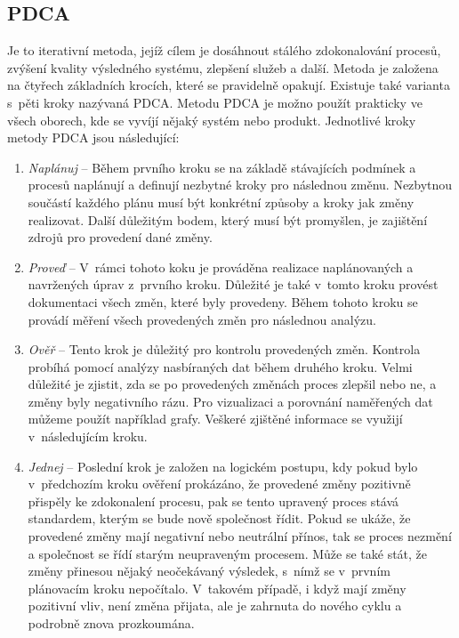 \documentclass[czech,master]{diploma}
\begin{document}
\subsection{PDCA}
Je to iterativní metoda, jejíž cílem je dosáhnout stálého zdokonalování procesů, zvýšení kvality výsledného systému, zlepšení služeb a další. Metoda je založena na čtyřech základních krocích, které se pravidelně opakují. Existuje také varianta s~pěti kroky nazývaná PDCA. Metodu PDCA je možno použít prakticky ve všech oborech, kde se vyvíjí nějaký systém nebo produkt.  Jednotlivé kroky metody PDCA jsou následující:

\begin{enumerate}
\item \textit{Naplánuj} -- Během prvního kroku se na základě stávajících podmínek a procesů naplánují a definují nezbytné kroky pro následnou změnu. Nezbytnou součástí každého plánu musí být konkrétní způsoby a kroky jak změny realizovat. Další důležitým bodem, který musí být promyšlen, je zajištění zdrojů pro provedení dané změny.
\item \textit{Proveď} -- V~rámci tohoto koku je prováděna realizace naplánovaných a navržených úprav z~prvního kroku. Důležité je také v~tomto kroku provést dokumentaci všech změn, které byly provedeny. Během tohoto kroku se provádí měření všech provedených změn pro následnou analýzu.
\item \textit{Ověř} -- Tento krok je důležitý pro kontrolu provedených změn. Kontrola probíhá pomocí analýzy nasbíraných dat během druhého kroku. Velmi důležité je zjistit, zda se po provedených změnách proces zlepšil nebo ne, a změny byly negativního rázu. Pro vizualizaci a porovnání naměřených dat můžeme použít například grafy. Veškeré zjištěné informace se využijí v~následujícím kroku.
\item \textit{Jednej} -- Poslední krok je založen na logickém postupu, kdy pokud bylo v~předchozím kroku ověření prokázáno, že provedené změny pozitivně přispěly ke zdokonalení procesu, pak se tento upravený proces stává standardem, kterým se bude nově společnost řídit. Pokud se ukáže, že provedené změny mají negativní nebo neutrální přínos, tak se proces nezmění a společnost se řídí starým neupraveným procesem. Může se také stát, že změny přinesou nějaký neočekávaný výsledek, s~nímž se v~prvním plánovacím kroku nepočítalo. V~takovém případě, i když mají změny pozitivní vliv, není změna přijata, ale je zahrnuta do nového cyklu a podrobně znova prozkoumána.
\end{enumerate}
\end{document}
